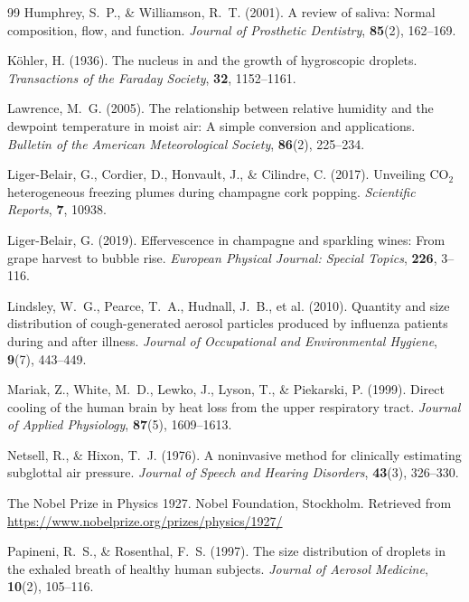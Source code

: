 \documentclass[11pt,a4paper]{article}
\theoremstyle{definition}
\theoremstyle{plain}
\begin{document}
\begin{thebibliography}{99}
Humphrey, S.~P., \& Williamson, R.~T. (2001).
A review of saliva: Normal composition, flow, and function.
\textit{Journal of Prosthetic Dentistry}, \textbf{85}(2), 162--169.

Köhler, H. (1936).
The nucleus in and the growth of hygroscopic droplets.
\textit{Transactions of the Faraday Society}, \textbf{32}, 1152--1161.

Lawrence, M.~G. (2005).
The relationship between relative humidity and the dewpoint temperature in moist air: A simple conversion and applications.
\textit{Bulletin of the American Meteorological Society}, \textbf{86}(2), 225--234.

Liger-Belair, G., Cordier, D., Honvault, J., \& Cilindre, C. (2017).
Unveiling CO$_2$ heterogeneous freezing plumes during champagne cork popping.
\textit{Scientific Reports}, \textbf{7}, 10938.

Liger-Belair, G. (2019).
Effervescence in champagne and sparkling wines: From grape harvest to bubble rise.
\textit{European Physical Journal: Special Topics}, \textbf{226}, 3--116.

Lindsley, W.~G., Pearce, T.~A., Hudnall, J.~B., et al. (2010).
Quantity and size distribution of cough-generated aerosol particles produced by influenza patients during and after illness.
\textit{Journal of Occupational and Environmental Hygiene}, \textbf{9}(7), 443--449.

Mariak, Z., White, M.~D., Lewko, J., Lyson, T., \& Piekarski, P. (1999).
Direct cooling of the human brain by heat loss from the upper respiratory tract.
\textit{Journal of Applied Physiology}, \textbf{87}(5), 1609--1613.

Netsell, R., \& Hixon, T.~J. (1976).
A noninvasive method for clinically estimating subglottal air pressure.
\textit{Journal of Speech and Hearing Disorders}, \textbf{43}(3), 326--330.

The Nobel Prize in Physics 1927.
Nobel Foundation, Stockholm.
Retrieved from \url{https://www.nobelprize.org/prizes/physics/1927/}

Papineni, R.~S., \& Rosenthal, F.~S. (1997).
The size distribution of droplets in the exhaled breath of healthy human subjects.
\textit{Journal of Aerosol Medicine}, \textbf{10}(2), 105--116.


\end{thebibliography}
\end{document}
